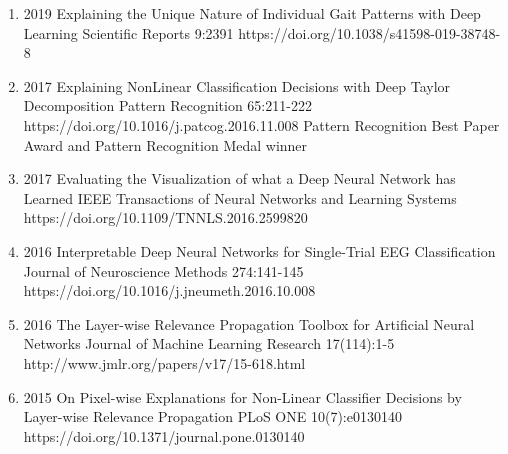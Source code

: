 \documentclass[10pt,a4paper]{article} %
\begin{document}
{\begin{enumerate}
    \item[] 
                        {2019}
                        {Explaining the Unique Nature of Individual Gait Patterns with Deep Learning}
                        {Scientific Reports}
                        {9:2391}
                        {https://doi.org/10.1038/s41598-019-38748-8}

    \item[] 
                            {2017}
                            {Explaining NonLinear Classification Decisions with Deep Taylor Decomposition}
                            {Pattern Recognition}
                            {65:211-222}
                            {https://doi.org/10.1016/j.patcog.2016.11.008}
                            {Pattern Recognition Best Paper Award and Pattern Recognition Medal winner}

    \item[] 
                        {2017}
                        {Evaluating the Visualization of what a Deep Neural Network has Learned}
                        {IEEE Transactions of Neural Networks and Learning Systems}
                        {}
                        {https://doi.org/10.1109/TNNLS.2016.2599820}

    \item[] 
                        {2016}
                        {Interpretable Deep Neural Networks for Single-Trial EEG Classification}
                        {Journal of Neuroscience Methods}
                        {274:141-145}
                        {https://doi.org/10.1016/j.jneumeth.2016.10.008}

    \item[] 
                        {2016}
                        {The Layer-wise Relevance Propagation Toolbox for Artificial Neural Networks}
                        {Journal of Machine Learning Research}
                        {17(114):1-5}
                        {http://www.jmlr.org/papers/v17/15-618.html}

    \item[] 
                        {2015}
                        {On Pixel-wise Explanations for Non-Linear Classifier Decisions by Layer-wise Relevance Propagation}
                        {PLoS ONE}
                        {10(7):e0130140}
                        {https://doi.org/10.1371/journal.pone.0130140}
\end{enumerate}
}
\end{document}

